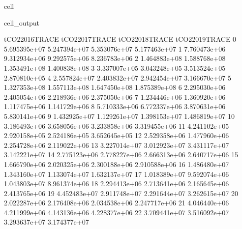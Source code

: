 \documentclass[letterpaper,10pt,english]{jupyterBook}
\begin{document}
\begin{sphinxuseclass}{cell}
\begin{sphinxVerbatimOutput}
\begin{sphinxuseclass}{cell_output}
\begin{sphinxVerbatim}[commandchars=\\\{\}]
    tCO2\PYGZus{}2016\PYGZus{}TRACE  tCO2\PYGZus{}2017\PYGZus{}TRACE  tCO2\PYGZus{}2018\PYGZus{}TRACE  tCO2\PYGZus{}2019\PYGZus{}TRACE  \PYGZbs{}
0      5.695395e+07     5.247394e+07     5.353076e+07     5.177463e+07   
1      7.760473e+06     9.312934e+06     9.292575e+06     8.236783e+06   
2      1.464883e+08     1.588768e+08     1.353491e+08     1.400838e+08   
3      3.337007e+05     3.043248e+05     3.513524e+05     2.870810e+05   
4      2.557824e+07     2.403832e+07     2.942454e+07     3.166670e+07   
5      1.327353e+08     1.557113e+08     1.647450e+08     1.875389e+08   
6      2.295030e+06     2.405054e+06     2.218936e+06     2.375050e+06   
7      1.234446e+06     1.360920e+06     1.117475e+06     1.141729e+06   
8      5.710333e+06     6.772337e+06     3.870631e+06     5.830141e+06   
9      1.432925e+07     1.129261e+07     1.398153e+07     1.486819e+07   
10     3.186493e+06     3.658056e+06     3.233858e+06     3.319455e+06   
11     4.241102e+05     2.920158e+05     2.524186e+05     3.652645e+05   
12     2.529358e+06     1.477960e+06     2.254728e+06     2.119022e+06   
13     3.227014e+07     3.012923e+07     3.431117e+07     3.142221e+07   
14     2.775123e+06     2.778227e+06     2.666313e+06     2.640717e+06   
15     1.666790e+06     2.020325e+06     2.300188e+06     2.910588e+06   
16     1.486480e+07     1.343160e+07     1.133074e+07     1.632137e+07   
17     1.018389e+07     9.592074e+06     1.043803e+07     8.961374e+06   
18     2.294413e+06     2.713641e+06     2.165645e+06     2.413765e+06   
19     4.452483e+07     2.911748e+07     2.291644e+07     3.262615e+07   
20     2.022287e+06     2.176408e+06     2.034538e+06     2.247717e+06   
21     4.046440e+06     4.211999e+06     4.143136e+06     4.228377e+06   
22     3.709441e+07     3.516092e+07     3.293637e+07     3.174377e+07   


\end{sphinxVerbatim}
\end{sphinxuseclass}
\end{sphinxVerbatimOutput}
\end{sphinxuseclass}
\end{document}
